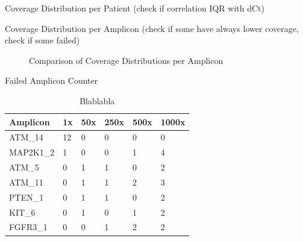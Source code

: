 Coverage Distribution per Patient (check if correlation IQR with dCt)

Coverage Distribution per Amplicon (check if some have always lower coverage, check if some failed)
\begin{figure}[!tbp]
  \centering
  \hfill
  \caption{Comparison of Coverage Distributions per Amplicon}
\end{figure}




Failed Amplicon Counter

\begin{table}[!htbp]
  \caption[failed_halo]{Blablabla}
  \centering
  \begin{tabular}{|p{2cm}||p{1.1cm}|p{1.1cm}|p{1.1cm}|p{1.1cm}|p{1.1cm}|}
    \hline
    Amplicon & 1x & 50x & 250x & 500x & 1000x \\ \hline \hline
    ATM\_14 & 12 & 0 & 0 & 0 & 0 \\
    MAP2K1\_2 & 1 & 0 & 0 & 1 & 4 \\
    ATM\_5 & 0 & 1 & 1 & 0 & 2 \\
    ATM\_11 & 0 & 1 & 1 & 2 & 3 \\
    PTEN\_1 & 0 & 1 & 1 & 0 & 2 \\
    KIT\_6 & 0 & 1 & 0 & 1 & 2 \\
    FGFR3\_1 & 0 & 0 & 1 & 2 & 2 \\ \hline
  \end{tabular}
\end{table}

